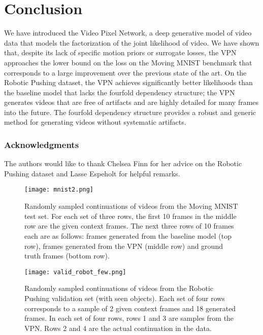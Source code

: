 \documentclass{article}
\begin{document}
\section{Conclusion}

We have introduced the Video Pixel Network, a deep generative model of video data that models the factorization of the joint likelihood of video. We have shown that, despite its lack of specific motion priors or surrogate losses, the VPN approaches the lower bound on the loss on the Moving MNIST benchmark that corresponds to a large improvement over the previous state of the art. On the Robotic Pushing dataset, the VPN achieves significantly better likelihoods than the baseline model that lacks the fourfold dependency structure; the VPN generates videos that are free of artifacts and are highly detailed for many frames into the future. The fourfold dependency structure provides a robust and generic method for generating videos without systematic artifacts.

\subsubsection*{Acknowledgments}

The authors would like to thank Chelsea Finn for her advice on the Robotic Pushing dataset and Lasse Espeholt for helpful remarks.




{
\small

}

\centering

\begin{figure}
\vspace{-2cm}
\hspace{-1.5cm}
\texttt{[image: mnist2.png]}
\caption{Randomly sampled continuations of videos from the Moving MNIST test set. For each set of three rows, the first 10 frames in the middle row are the given context frames. The next three rows of 10 frames each are as follows: frames generated from the baseline model (top row), frames generated from the VPN (middle row) and ground truth frames (bottom row).}
\label{fig:samples_mnist}
\end{figure}


\begin{figure}
\vspace{-2cm}
\texttt{[image: valid\_robot\_few.png]}
\caption{Randomly sampled continuations of videos from the Robotic Pushing validation set (with seen objects). Each set of four rows corresponds to a sample of 2 given context frames and 18 generated frames. In each set of four rows, rows 1 and 3 are samples from the VPN. Rows 2 and 4 are the actual continuation in the data.}
\label{fig:robot_valid}
\end{figure}
\end{document}
